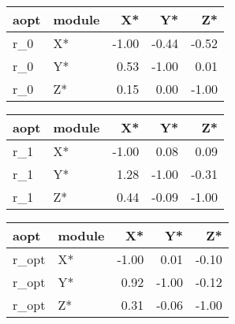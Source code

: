 \documentclass[10pt,a4paper]{article}
\begin{document}
\begin{table}[ht]
\centering
\begin{tabular}{llrrr}
  \hline
aopt & module & X* & Y* & Z* \\ 
  \hline
r\_0 & X* & -1.00 & -0.44 & -0.52 \\ 
  r\_0 & Y* & 0.53 & -1.00 & 0.01 \\ 
  r\_0 & Z* & 0.15 & 0.00 & -1.00 \\ 
   \hline
\end{tabular}
\end{table}


\begin{table}[ht]
\centering
\begin{tabular}{llrrr}
  \hline
aopt & module & X* & Y* & Z* \\ 
  \hline
r\_1 & X* & -1.00 & 0.08 & 0.09 \\ 
  r\_1 & Y* & 1.28 & -1.00 & -0.31 \\ 
  r\_1 & Z* & 0.44 & -0.09 & -1.00 \\ 
   \hline
\end{tabular}
\end{table}


\begin{table}[ht]
\centering
\begin{tabular}{llrrr}
  \hline
aopt & module & X* & Y* & Z* \\ 
  \hline
r\_opt & X* & -1.00 & 0.01 & -0.10 \\ 
  r\_opt & Y* & 0.92 & -1.00 & -0.12 \\ 
  r\_opt & Z* & 0.31 & -0.06 & -1.00 \\ 
   \hline
\end{tabular}
\end{table}
 
\end{document}
